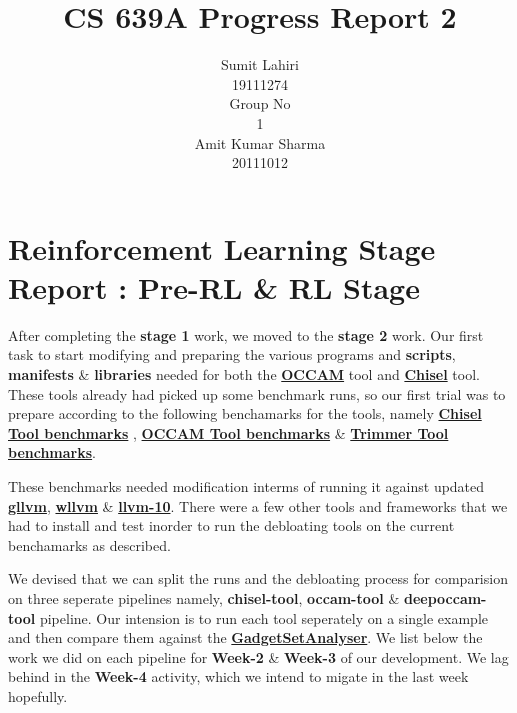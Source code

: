 \documentclass{article} %
\title{CS 639A Progress Report 2}
\author{
Sumit Lahiri \\
19111274 \\
\And
Group No\\
1\\
\And
Amit Kumar Sharma \\
20111012\\
}
\begin{document}
\maketitle

\section*{Reinforcement Learning Stage Report : Pre-RL \& RL Stage}
After completing the \textbf{stage 1} work, we moved to the \textbf{stage 2} work. Our first task to start modifying and preparing the various programs and \textbf{scripts}, \textbf{manifests} \& \textbf{libraries} needed for both the \textbf{\href{https://github.com/ashish-gehani/OCCAM}{OCCAM}} tool and \textbf{\href{https://github.com/aspire-project/chisel}{Chisel}} tool. These tools already had picked up some benchmark runs, so our first trial was to prepare according to the following benchamarks for the tools, namely \textbf{\href{https://github.com/lahiri-phdworks/chisel-bench}{Chisel Tool benchmarks}} , \textbf{\href{https://github.com/lahiri-phdworks/OCCAM-Benchmarks}{OCCAM Tool benchmarks}} \& \textbf{\href{https://github.com/ashish-gehani/OCCAM-Benchmarks}{Trimmer Tool benchmarks}}.  

These benchmarks needed modification interms of running it against updated \textbf{\href{https://github.com/SRI-CSL/gllvm}{gllvm}}, \textbf{\href{https://github.com/SRI-CSL/whole-program-llvm}{wllvm}} \& \textbf{\href{https://github.com/lahiri-phdworks/llvm-project/tree/release/10.x}{llvm-10}}. There were a few other tools and frameworks that we had to install and test inorder to run the debloating tools on the current benchamarks as described. 

We devised that we can split the runs and the debloating process for comparision on three seperate pipelines namely, \textbf{chisel-tool}, \textbf{occam-tool}
\& \textbf{deepoccam-tool} pipeline. Our intension is to run each tool seperately on a single example and then compare them against the \textbf{\href{https://github.com/michaelbrownuc/GadgetSetAnalyzer}{GadgetSetAnalyser}}. We list below the work we did on each pipeline for \textbf{Week-2} \& \textbf{Week-3} of our development. We lag behind in the \textbf{Week-4} activity, which we intend to migate in the last week hopefully. 
\end{document}
